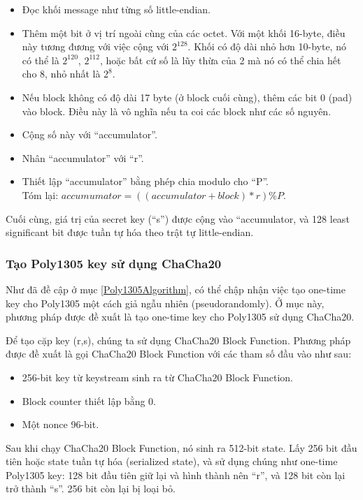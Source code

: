 \begin{itemize}
    \item Đọc khối message như từng số little-endian.
    \item Thêm một bit ở vị trí ngoài cùng của các octet. Với một khối 16-byte, điều này tương đương với việc cộng với $2^{128}$. Khối có độ dài nhỏ hơn 10-byte, nó có thể là $2^{120}$, $2^{112}$, hoặc bất cứ số là lũy thừa của 2 mà nó có thể chia hết cho 8, nhỏ nhất là $2^8$.
    \item Nếu block không có độ dài 17 byte (ở block cuối cùng), thêm các bit 0 (pad) vào block. Điều này là vô nghĩa nếu ta coi các block như các số nguyên.
    \item Cộng số này với ``accumulator''.
    \item Nhân ``accumulator'' với ``r''.
    \item Thiết lập ``accumulator'' bằng phép chia modulo cho ``P''. \\Tóm lại: $accumumator = ((accumulator+block)*r) \% P$.
\end{itemize}

Cuối cùng, giá trị của secret key (``s'') được cộng vào ``accumulator,  và 128 least significant bit được tuần tự hóa theo trật tự little-endian.

\subsubsection{Tạo Poly1305 key sử dụng ChaCha20}
\label{CreatePoly1305UsingChaCha20}

Như đã đề cập ở mục \ref{Poly1305Algorithm}, có thể chập nhận việc tạo one-time key cho Poly1305 một cách giả ngẫu nhiên (pseudorandomly). Ở mục này, phương pháp được đề xuất là tạo one-time key cho Poly1305 sử dụng ChaCha20.

Để tạo cặp key (r,s), chúng ta sử dụng ChaCha20 Block Function. Phương pháp được đề xuất là gọi ChaCha20 Block Function với các tham số đầu vào như sau:

\begin{itemize}
    \item 256-bit key từ keystream sinh ra từ ChaCha20 Block Function.
    \item Block counter thiết lập bằng 0.
    \item Một nonce 96-bit.
\end{itemize}

Sau khi chạy ChaCha20 Block Function, nó sinh ra 512-bit state. Lấy 256 bit đầu tiên hoặc state tuần tự hóa (serialized state), và sử dụng chúng như one-time Poly1305 key: 128 bit đầu tiên giữ lại và hình thành nên ``r'', và 128 bit còn lại trở thành ``s''. 256 bit còn lại bị loại bỏ.

